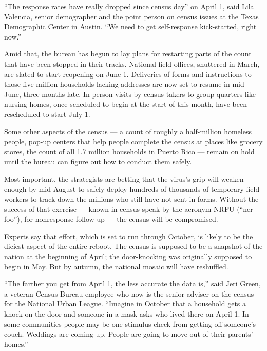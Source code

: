 ``The response rates have really dropped since census day'' on April 1,
said Lila Valencia, senior demographer and the point person on census
issues at the Texas Demographic Center in Austin. ``We need to get
self-response kick-started, right now.''

Amid that, the bureau has
\href{https://2020census.gov/content/dam/2020census/materials/news/2020-census\%20operational-adjustments-long\%20version.pdf}{begun
to lay plans} for restarting parts of the count that have been stopped
in their tracks. National field offices, shuttered in March, are slated
to start reopening on June 1. Deliveries of forms and instructions to
those five million households lacking addresses are now set to resume in
mid-June, three months late. In-person visits by census takers to group
quarters like nursing homes, once scheduled to begin at the start of
this month, have been rescheduled to start July 1.

Some other aspects of the census --- a count of roughly a half-million
homeless people, pop-up centers that help people complete the census at
places like grocery stores, the count of all 1.7 million households in
Puerto Rico --- remain on hold until the bureau can figure out how to
conduct them safely.

Most important, the strategists are betting that the virus's grip will
weaken enough by mid-August to safely deploy hundreds of thousands of
temporary field workers to track down the millions who still have not
sent in forms. Without the success of that exercise --- known in
census-speak by the acronym NRFU (``ner-foo''), for nonresponse
follow-up --- the census will be compromised.

Experts say that effort, which is set to run through October, is likely
to be the diciest aspect of the entire reboot. The census is supposed to
be a snapshot of the nation at the beginning of April; the door-knocking
was originally supposed to begin in May. But by autumn, the national
mosaic will have reshuffled.

``The farther you get from April 1, the less accurate the data is,''
said Jeri Green, a veteran Census Bureau employee who now is the senior
adviser on the census for the National Urban League. ``Imagine in
October that a household gets a knock on the door and someone in a mask
asks who lived there on April 1. In some communities people may be one
stimulus check from getting off someone's couch. Weddings are coming up.
People are going to move out of their parents' homes.''

